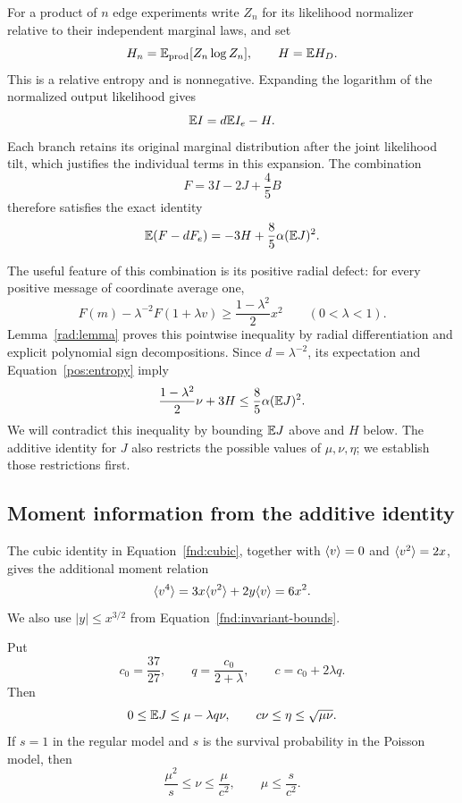 For a product of \(n\) edge experiments write \(Z_n\) for its likelihood
normalizer relative to their independent marginal laws, and set
\[
 H_n=\mathbb E_{\mathrm{prod}}[Z_n\log Z_n],\qquad H=\mathbb E H_{D}.
\]
This is a relative entropy and is nonnegative. Expanding the logarithm of
the normalized output likelihood gives
\[
 \mathbb E I=d\mathbb E I_e-H.
\]
Each branch retains its original marginal distribution after the joint
likelihood tilt, which justifies the individual terms in this expansion.
The combination
\begin{equation}\label{pos:functional-F}
 F=3I-2J+\frac45B
\end{equation}
therefore satisfies the exact identity
\begin{equation}\label{pos:entropy}
 \mathbb E(F-dF_e)=-3H+\frac85\alpha(\mathbb E J)^2.
\end{equation}

The useful feature of this combination is its positive radial defect:
for every positive message of coordinate average one,
\begin{equation}\label{pos:radial}
 F(m)-\lambda^{-2}F(1+\lambda v)
 \ge\frac{1-\lambda^2}{2}x^2\qquad(0<\lambda<1).
\end{equation}
Lemma~\ref{rad:lemma} proves this pointwise inequality by radial
differentiation and explicit polynomial sign decompositions.
Since $d=\lambda^{-2}$, its expectation and
Equation~\eqref{pos:entropy} imply
\begin{equation}\label{pos:comparison}
 \frac{1-\lambda^2}{2}\nu+3H
 \le\frac85\alpha(\mathbb E J)^2.
\end{equation}
We will contradict this inequality by bounding $\mathbb E J$ above and $H$
below. The additive identity for $J$ also restricts the possible values
of $\mu,\nu,\eta$; we establish those restrictions first.

\subsection{Moment information from the additive identity}

The cubic identity in Equation~\eqref{fnd:cubic}, together with
$\langle v\rangle=0$ and $\langle v^2\rangle=2x$, gives the additional moment relation
\begin{equation}\label{pos:coordinate-identities}
 \langle v^4\rangle=3x\langle v^2\rangle+2y\langle v\rangle=6x^2.
\end{equation}
We also use $|y|\le x^{3/2}$ from
Equation~\eqref{fnd:invariant-bounds}.

\begin{lemma}\label{pos:moment-bounds}
Put
\[
 c_0=\frac{37}{27},\qquad q=\frac{c_0}{2+\lambda},\qquad
 c=c_0+2\lambda q.
\]
Then
\begin{equation}\label{pos:moment-estimates}
 0\le\mathbb E J\le\mu-\lambda q\nu,
 \qquad c\nu\le\eta\le\sqrt{\mu\nu}.
\end{equation}
If \(s=1\) in the regular model and \(s\) is the survival probability in
the Poisson model, then
\begin{equation}\label{pos:moment-region}
 \frac{\mu^2}{s}\le\nu\le\frac{\mu}{c^2},\qquad
 \mu\le\frac{s}{c^2}.
\end{equation}
\end{lemma}

